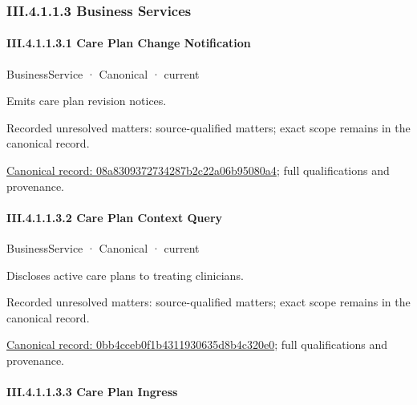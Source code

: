 \subsubsection*{III.4.1.1.3 Business Services}
\label{navigation:III.4.1.1.3}

\paragraph*{III.4.1.1.3.1 Care Plan Change Notification}
\label{navigation:III.4.1.1.3.1}

\label{element:08a8309372734287b2c22a06b95080a4}
{\small BusinessService · Canonical · current}\par

Emits care plan revision notices.


{\small Recorded unresolved matters: source-qualified matters; exact scope remains in the canonical record.}\par
{\footnotesize \href{../../../../../../../continuum/business/business-service/08a8309372734287b2c22a06b95080a4.md}{Canonical record: 08a8309372734287b2c22a06b95080a4}; full qualifications and provenance.}\par
\paragraph*{III.4.1.1.3.2 Care Plan Context Query}
\label{navigation:III.4.1.1.3.2}

\label{element:0bb4cceb0f1b4311930635d8b4c320e0}
{\small BusinessService · Canonical · current}\par

Discloses active care plans to treating clinicians.


{\small Recorded unresolved matters: source-qualified matters; exact scope remains in the canonical record.}\par
{\footnotesize \href{../../../../../../../continuum/business/business-service/0bb4cceb0f1b4311930635d8b4c320e0.md}{Canonical record: 0bb4cceb0f1b4311930635d8b4c320e0}; full qualifications and provenance.}\par
\paragraph*{III.4.1.1.3.3 Care Plan Ingress}
\label{navigation:III.4.1.1.3.3}

